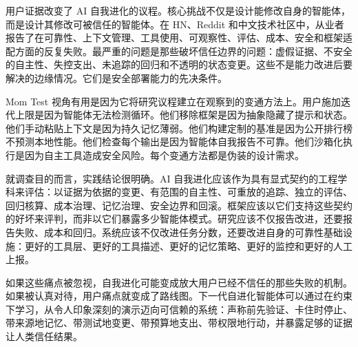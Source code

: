 用户证据改变了 AI 自我进化的议程。核心挑战不仅是设计能修改自身的智能体，而是设计其修改可被信任的智能体。在 HN、Reddit 和中文技术社区中，从业者报告了在可靠性、上下文管理、工具使用、可观察性、评估、成本、安全和框架适配方面的反复失败。最严重的问题是那些破坏信任边界的问题：虚假证据、不安全的自主性、失控支出、未追踪的回归和不透明的状态变更。这些不是能力改进后要解决的边缘情况。它们是安全部署能力的先决条件。

Mom Test 视角有用是因为它将研究议程建立在观察到的变通方法上。用户施加迭代上限是因为智能体无法检测循环。他们移除框架是因为抽象隐藏了提示和状态。他们手动粘贴上下文是因为持久记忆薄弱。他们构建定制的基准是因为公开排行榜不预测本地性能。他们检查每个输出是因为智能体自我报告不可靠。他们沙箱化执行是因为自主工具造成安全风险。每个变通方法都是伪装的设计需求。

就调查目的而言，实践结论很明确。AI 自我进化应该作为具有显式契约的工程学科来评估：以证据为依据的变更、有范围的自主性、可重放的追踪、独立的评估、回归核算、成本治理、记忆治理、安全边界和回滚。框架应该以它们支持这些契约的好坏来评判，而非以它们暴露多少智能体模式。研究应该不仅报告改进，还要报告失败、成本和回归。系统应该不仅改进任务分数，还要改进自身的可靠性基础设施：更好的工具层、更好的工具描述、更好的记忆策略、更好的监控和更好的人工上报。

如果这些痛点被忽视，自我进化可能变成放大用户已经不信任的那些失败的机制。如果被认真对待，用户痛点就变成了路线图。下一代自进化智能体可以通过在约束下学习，从令人印象深刻的演示迈向可信赖的系统：声称前先验证、卡住时停止、带来源地记忆、带测试地变更、带预算地支出、带权限地行动，并暴露足够的证据让人类信任结果。
